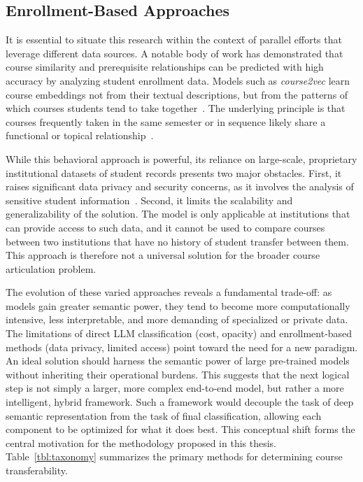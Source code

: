 \begin{introduction}
    \subsection{Enrollment-Based Approaches}
    It is essential to situate this research within the context of parallel efforts that leverage different data sources. A notable body of work has demonstrated that course similarity and prerequisite relationships can be predicted with high accuracy by analyzing student enrollment data. Models such as \emph{course2vec} learn course embeddings not from their textual descriptions, but from the patterns of which courses students tend to take together~\cite{pardos2018connectionistrecommendationwildutility}. The underlying principle is that courses frequently taken in the same semester or in sequence likely share a functional or topical relationship~\cite{pardos2018connectionistrecommendationwildutility}.

    While this behavioral approach is powerful, its reliance on large-scale, proprietary institutional datasets of student records presents two major obstacles. First, it raises significant data privacy and security concerns, as it involves the analysis of sensitive student information~\cite{slade10.1177/0002764213479366}. Second, it limits the scalability and generalizability of the solution. The model is only applicable at institutions that can provide access to such data, and it cannot be used to compare courses between two institutions that have no history of student transfer between them. This approach is therefore not a universal solution for the broader course articulation problem.

    The evolution of these varied approaches reveals a fundamental trade-off: as models gain greater semantic power, they tend to become more computationally intensive, less interpretable, and more demanding of specialized or private data. The limitations of direct LLM classification (cost, opacity) and enrollment-based methods (data privacy, limited access) point toward the need for a new paradigm. An ideal solution should harness the semantic power of large pre-trained models without inheriting their operational burdens. This suggests that the next logical step is not simply a larger, more complex end-to-end model, but rather a more intelligent, hybrid framework. Such a framework would decouple the task of deep semantic representation from the task of final classification, allowing each component to be optimized for what it does best. This conceptual shift forms the central motivation for the methodology proposed in this thesis.  Table~\ref{tbl:taxonomy} summarizes the primary methods for determining course transferability.


\end{introduction}
